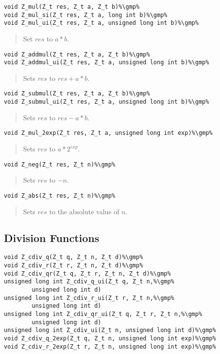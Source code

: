\documentclass[a4paper,10pt]{article}
\newcommand{\gmp}{\hfill[GMP]}
\begin{document}
\begin{lstlisting}
void Z_mul(Z_t res, Z_t a, Z_t b)%\gmp%
void Z_mul_si(Z_t res, Z_t a, long int b)%\gmp%
void Z_mul_ui(Z_t res, Z_t a, unsigned long int b)%\gmp%
\end{lstlisting}
\begin{quote}Set $res$ to $a*b$.\end{quote} 

\begin{lstlisting}
void Z_addmul(Z_t res, Z_t a, Z_t b)%\gmp%
void Z_addmul_ui(Z_t res, Z_t a, unsigned long int b)%\gmp%
\end{lstlisting}
\begin{quote}Sets $res$ to $res + a*b$.\end{quote} 

\begin{lstlisting}
void Z_submul(Z_t res, Z_t a, Z_t b)%\gmp%
void Z_submul_ui(Z_t res, Z_t a, unsigned long int b)%\gmp%
\end{lstlisting}
\begin{quote}Sets $res$ to $res - a*b$.\end{quote} 

\begin{lstlisting}
void Z_mul_2exp(Z_t res, Z_t a, unsigned long int exp)%\gmp%
\end{lstlisting}
\begin{quote}Sets $res$ to $a*2^{exp}$.\end{quote} 

\begin{lstlisting}
void Z_neg(Z_t res, Z_t n)%\gmp%
\end{lstlisting}
\begin{quote}Sets $res$ to $-n$.\end{quote} 

\begin{lstlisting}
void Z_abs(Z_t res, Z_t n)%\gmp%
\end{lstlisting}
\begin{quote}Sets $res$ to the absolute value of $n$.\end{quote} 

\subsection{Division Functions}
\begin{lstlisting}
void Z_cdiv_q(Z_t q, Z_t n, Z_t d)%\gmp%
void Z_cdiv_r(Z_t r, Z_t n, Z_t d)%\gmp%
void Z_cdiv_qr(Z_t q, Z_t r, Z_t n, Z_t d)%\gmp%
unsigned long int Z_cdiv_q_ui(Z_t q, Z_t n,%\gmp% 
        unsigned long int d)
unsigned long int Z_cdiv_r_ui(Z_t r, Z_t n,%\gmp% 
        unsigned long int d)
unsigned long int Z_cdiv_qr_ui(Z_t q, Z_t r, Z_t n,%\gmp%
        unsigned long int d)
unsigned long int Z_cdiv_ui(Z_t n, unsigned long int d)%\gmp%
void Z_cdiv_q_2exp(Z_t q, Z_t n, unsigned long int exp)%\gmp%
void Z_cdiv_r_2exp(Z_t r, Z_t n, unsigned long int exp)%\gmp%
\end{lstlisting}
\end{document}
